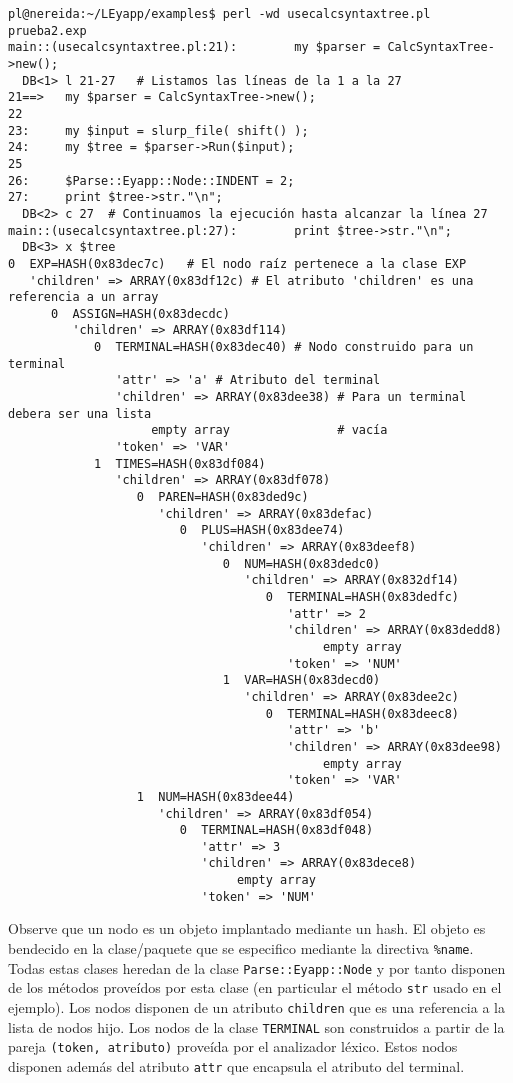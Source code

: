 \begin{verbatim}
pl@nereida:~/LEyapp/examples$ perl -wd usecalcsyntaxtree.pl prueba2.exp
main::(usecalcsyntaxtree.pl:21):        my $parser = CalcSyntaxTree->new();
  DB<1> l 21-27   # Listamos las líneas de la 1 a la 27
21==>   my $parser = CalcSyntaxTree->new();
22
23:     my $input = slurp_file( shift() );
24:     my $tree = $parser->Run($input);
25
26:     $Parse::Eyapp::Node::INDENT = 2;
27:     print $tree->str."\n";
  DB<2> c 27  # Continuamos la ejecución hasta alcanzar la línea 27
main::(usecalcsyntaxtree.pl:27):        print $tree->str."\n";
  DB<3> x $tree
0  EXP=HASH(0x83dec7c)   # El nodo raíz pertenece a la clase EXP
   'children' => ARRAY(0x83df12c) # El atributo 'children' es una referencia a un array
      0  ASSIGN=HASH(0x83decdc)
         'children' => ARRAY(0x83df114)
            0  TERMINAL=HASH(0x83dec40) # Nodo construido para un terminal
               'attr' => 'a' # Atributo del terminal
               'children' => ARRAY(0x83dee38) # Para un terminal debera ser una lista 
                    empty array               # vacía
               'token' => 'VAR'
            1  TIMES=HASH(0x83df084)
               'children' => ARRAY(0x83df078)
                  0  PAREN=HASH(0x83ded9c)
                     'children' => ARRAY(0x83defac)
                        0  PLUS=HASH(0x83dee74)
                           'children' => ARRAY(0x83deef8)
                              0  NUM=HASH(0x83dedc0)
                                 'children' => ARRAY(0x832df14)
                                    0  TERMINAL=HASH(0x83dedfc)
                                       'attr' => 2
                                       'children' => ARRAY(0x83dedd8)
                                            empty array
                                       'token' => 'NUM'
                              1  VAR=HASH(0x83decd0)
                                 'children' => ARRAY(0x83dee2c)
                                    0  TERMINAL=HASH(0x83deec8)
                                       'attr' => 'b'
                                       'children' => ARRAY(0x83dee98)
                                            empty array
                                       'token' => 'VAR'
                  1  NUM=HASH(0x83dee44)
                     'children' => ARRAY(0x83df054)
                        0  TERMINAL=HASH(0x83df048)
                           'attr' => 3
                           'children' => ARRAY(0x83dece8)
                                empty array
                           'token' => 'NUM'
\end{verbatim}
Observe que un nodo es un objeto implantado mediante un hash. El objeto es bendecido
en la clase/paquete que se especifico mediante la directiva \verb|%name|. Todas estas clases
heredan de la clase \verb|Parse::Eyapp::Node| y por tanto disponen de los métodos
proveídos por esta clase (en particular el método \verb|str| usado en el ejemplo).
Los nodos disponen de un atributo \verb|children| que es una referencia a la lista de
nodos hijo. Los nodos de la clase \verb|TERMINAL| son construidos a partir
de la pareja \verb|(token, atributo)| proveída por el analizador léxico. Estos nodos 
disponen además del atributo \verb|attr| que encapsula el atributo del terminal.

